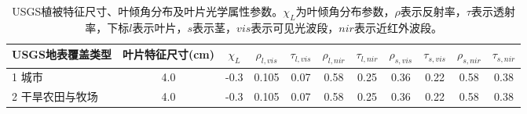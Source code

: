 \begin{sidewaystable}[]
\centering
\caption{USGS植被特征尺寸、叶倾角分布及叶片光学属性参数。$\chi_L$为叶倾角分布参数，$\rho$表示反射率，$\tau$表示透射率，下标$l$表示叶片，$s$表示茎，$vis$表示可见光波段，$nir$表示近红外波段。}
\label{tab:USGS植被特征尺寸叶倾角分布及叶片光学属性参数1}
    \begin{tabular}{@{}lcccccccccc@{}}
    \toprule
    USGS地表覆盖类型     & 叶片特征尺寸(cm) & $\chi_L$ &$\rho_{l, vis}$ & $\tau_{l, vis}$  &$\rho_{l, nir}$ &$\tau_{l, nir}$ & $\rho_{s, vis}$ &$\tau_{s, vis}$ &$\rho_{s, nir}$ &$\tau_{s,nir}$\\ \midrule
    1 城市           & 4.0        & -0.3                                                                         & 0.105                                                                                                           & 0.07                                                                                                            & 0.58                                                                                                            & 0.25                                                                                                            & 0.36                                                                                                            & 0.22                                                                                                            & 0.58                                                                                                            & 0.38                                                                                                            \\
    2 干旱农田与牧场      & 4.0        & -0.3                                                                         & 0.105                                                                                                           & 0.07                                                                                                            & 0.58                                                                                                            & 0.25                                                                                                            & 0.36                                                                                                            & 0.22                                                                                                            & 0.58                                                                                                            & 0.38                                                                                                            \\

\end{tabular}
\end{sidewaystable}
